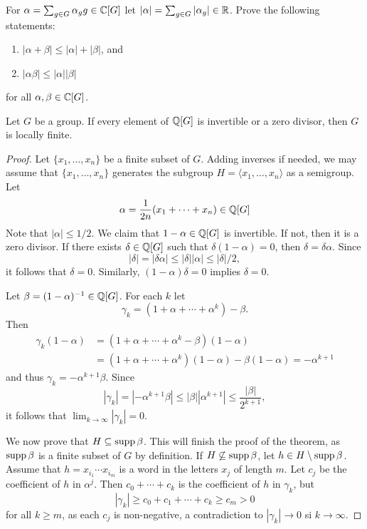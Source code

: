 \begin{exercise}
	\label{exa:norma}
	For $\alpha=\sum_{g\in G}\alpha_gg\in\mathbb{C}[G]$ let $|\alpha|=\sum_{g\in
	G}|\alpha_g|\in\mathbb{R}$. Prove the following statements:
	\begin{enumerate}
		\item $|\alpha+\beta|\leq|\alpha|+|\beta|$, and 
		\item $|\alpha\beta|\leq|\alpha||\beta|$ 
	\end{enumerate}
	for all $\alpha,\beta\in\mathbb{C}[G]$.
\end{exercise}

\begin{theorem}[Formanek]
	\label{thm:FormanekQ}
	Let $G$ be a group. If every element of $\mathbb{Q}[G]$ is invertible or 
	a zero divisor, then $G$ is locally finite. 
\end{theorem}

\begin{proof}
	Let $\{x_1,\dots,x_n\}$ be a finite subset of $G$. Adding inverses if needed, we may assume that 
	$\{x_1,\dots,x_n\}$ generates the subgroup
	$H=\langle x_1,\dots,x_n\rangle$ as a semigroup. Let 
	\[
		\alpha=\frac{1}{2n}(x_1+\cdots+x_n)\in\mathbb{Q}[G]
	\]
    Note that $|\alpha|\leq 1/2$. 
	We claim that $1-\alpha\in\mathbb{Q}[G]$ is invertible. If not, then it is a zero divisor. If there exists 
	$\delta\in\mathbb{Q}[G]$ such that $\delta(1-\alpha)=0$, then 
	$\delta=\delta\alpha$. Since  
	\[
		|\delta|=|\delta\alpha|\leq|\delta||\alpha|\leq|\delta|/2,
	\]
	it follows that $\delta=0$. Similarly, $(1-\alpha)\delta=0$ implies
	$\delta=0$. 
	
	Let $\beta=(1-\alpha)^{-1}\in\mathbb{Q}[G]$.  For each $k$ let  
	\[
		\gamma_k=(1+\alpha+\cdots+\alpha^k)-\beta.
	\]
	Then 
	\begin{align*}
		\gamma_k(1-\alpha)&=(1+\alpha+\cdots+\alpha^k-\beta)(1-\alpha)\\
		&=(1+\alpha+\cdots+\alpha^k)(1-\alpha)-\beta(1-\alpha)=-\alpha^{k+1}
	\end{align*}
	and thus  
	$\gamma_k=-\alpha^{k+1}\beta$. Since  
	\[
		|\gamma_k|=|-\alpha^{k+1}\beta|\leq|\beta||\alpha^{k+1}|\leq\frac{|\beta|}{2^{k+1}},
	\]
	it follows that $\lim_{k\to\infty}|\gamma_k|=0$. 

	We now prove that $H\subseteq\operatorname{supp}\beta$. This will finish the proof of the theorem, 
	as $\operatorname{supp}\beta$ is a finite subset of $G$ by definition. If
	$H\not\subseteq\operatorname{supp}\beta$, let $h\in H\setminus\operatorname{supp}\beta$.  Assume that 
    $h=x_{i_1}\cdots x_{i_m}$ is a word in the letters $x_j$ of length $m$. Let 
    $c_j$ be the coefficient of $h$ in $\alpha^j$. Then $c_0+\cdots+c_k$ is the 
	coefficient of $h$ in $\gamma_k$, but 
	\[
		|\gamma_k|\geq c_0+c_1+\cdots+c_k\geq c_m>0
	\]
	for all $k\geq m$, as each $c_j$ is non-negative, a contradiction to 
	$|\gamma_k|\to 0$ si $k\to\infty$.
\end{proof}

